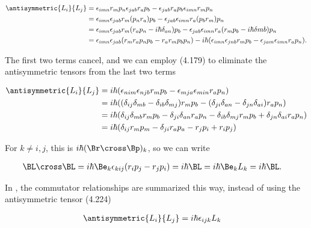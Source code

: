 \begin{align*}
\antisymmetric{L_i}{L_j}
&=
\epsilon_{imn} r_m p_n \epsilon_{jab} r_a p_b
- \epsilon_{jab} r_a p_b \epsilon_{imn} r_m p_n \\
&=
\epsilon_{imn} \epsilon_{jab} r_m (p_n r_a) p_b
- \epsilon_{jab} \epsilon_{imn} r_a (p_b r_m) p_n \\
&=
\epsilon_{imn} \epsilon_{jab} r_m (r_a p_n -i \hbar \delta_{an}) p_b
- \epsilon_{jab} \epsilon_{imn} r_a (r_m p_b - i \hbar \delta{mb}) p_n \\
&=
\epsilon_{imn} \epsilon_{jab} (r_m r_a p_n p_b - r_a r_m p_b p_n )
- i \hbar ( \epsilon_{imn} \epsilon_{jnb} r_m p_b - \epsilon_{jam} \epsilon_{imn} r_a p_n ).
\end{align*}

The first two terms cancel, and we can employ (4.179) to eliminate the antisymmetric tensors from the last two terms

\begin{align*}
\antisymmetric{L_i}{L_j}
&=
i \hbar ( \epsilon_{nim} \epsilon_{njb} r_m p_b - \epsilon_{mja} \epsilon_{min} r_a p_n ) \\
&=
i \hbar ( (\delta_{ij} \delta_{mb} -\delta_{ib} \delta_{mj}) r_m p_b - (\delta_{ji} \delta_{an} -\delta_{jn} \delta_{ai}) r_a p_n ) \\
&=
i \hbar (\delta_{ij} \delta_{mb} r_m p_b - \delta_{ji} \delta_{an} r_a p_n - \delta_{ib} \delta_{mj} r_m p_b + \delta_{jn} \delta_{ai} r_a p_n ) \\
&=
i \hbar (
\delta_{ij} r_m p_m
- \delta_{ji} r_a p_a
- r_j p_i
+ r_i p_j ) \\
\end{align*}

For $k \ne i,j$, this is $i\hbar (\Br \cross \Bp)_k$, so we can write

\begin{align}\label{eqn:desaiCh4:301}
\BL \cross \BL &= i\hbar \Be_k \epsilon_{kij} ( r_i p_j - r_j p_i ) = i\hbar \BL = i\hbar \Be_k L_k = i\hbar \BL.
\end{align}

In \cite{liboff2003iqm}, the commutator relationships are summarized this way, instead of using the antisymmetric tensor (4.224)

\begin{align}\label{eqn:desaiCh4:302}
\antisymmetric{L_i}{L_j} &= i \hbar \epsilon_{ijk} L_k
\end{align}

